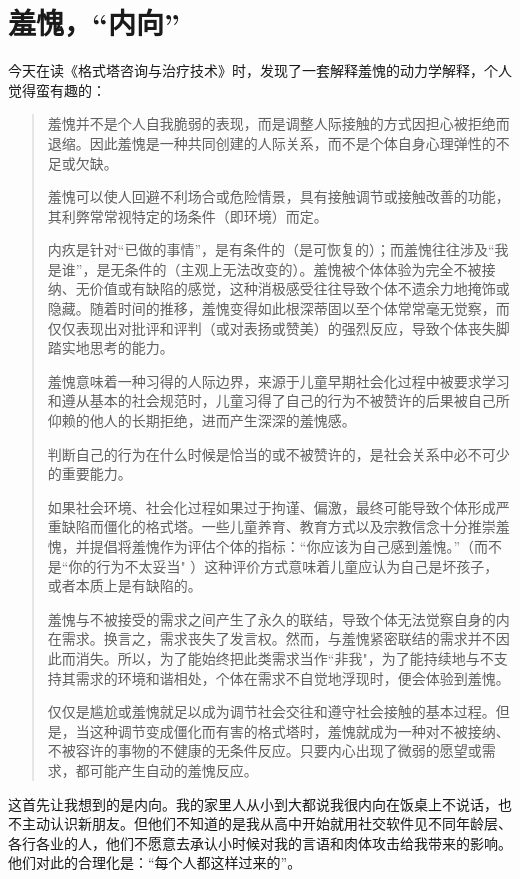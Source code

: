 \chapter{羞愧，“内向”}



今天在读《格式塔咨询与治疗技术》时，发现了一套解释羞愧的动力学解释，个人觉得蛮有趣的：

\blockquote{
    羞愧并不是个人自我脆弱的表现，而是调整人际接触的方式\pozhehao{}因担心被拒绝而退缩。因此羞愧是一种共同创建的人际关系，而不是个体自身心理弹性的不足或欠缺。

    羞愧可以使人回避不利场合或危险情景，具有接触调节或接触改善的功能，其利弊常常视特定的场条件（即环境）而定。

    内疚是针对“已做的事情”，是有条件的（是可恢复的）；而羞愧往往涉及“我是谁”，是无条件的（主观上无法改变的）。羞愧被个体体验为完全不被接纳、无价值或有缺陷的感觉，这种消极感受往往导致个体不遗余力地掩饰或隐藏。随着时间的推移，羞愧变得如此根深蒂固以至个体常常毫无觉察，而仅仅表现出对批评和评判（或对表扬或赞美）的强烈反应，导致个体丧失脚踏实地思考的能力。

    羞愧意味着一种习得的人际边界，来源于儿童早期社会化过程中被要求学习和遵从基本的社会规范时，儿童习得了自己的行为不被赞许的后果\pozhehao{}被自己所仰赖的他人的长期拒绝，进而产生深深的羞愧感。

    判断自己的行为在什么时候是恰当的或不被赞许的，是社会关系中必不可少的重要能力。

    如果社会环境、社会化过程如果过于拘谨、偏激，最终可能导致个体形成严重缺陷而僵化的格式塔。一些儿童养育、教育方式以及宗教信念十分推崇羞愧，并提倡将羞愧作为评估个体的指标：“你应该为自己感到羞愧。”（而不是“你的行为不太妥当" ）这种评价方式意味着儿童应认为自己是坏孩子，或者本质上是有缺陷的。

    羞愧与不被接受的需求之间产生了永久的联结，导致个体无法觉察自身的内在需求。换言之，需求丧失了发言权。然而，与羞愧紧密联结的需求并不因此而消失。所以，为了能始终把此类需求当作“非我"，为了能持续地与不支持其需求的环境和谐相处，个体在需求不自觉地浮现时，便会体验到羞愧。

    仅仅是尴尬或羞愧就足以成为调节社会交往和遵守社会接触的基本过程。但是，当这种调节变成僵化而有害的格式塔时，羞愧就成为一种对不被接纳、不被容许的事物的不健康的无条件反应。只要内心出现了微弱的愿望或需求，都可能产生自动的羞愧反应。
}

这首先让我想到的是内向。我的家里人从小到大都说我很内向\pozhehao{}在饭桌上不说话，也不主动认识新朋友。但他们不知道的是我从高中开始就用社交软件见不同年龄层、各行各业的人，他们不愿意去承认小时候对我的言语和肉体攻击给我带来的影响。他们对此的合理化是：“每个人都这样过来的”。

